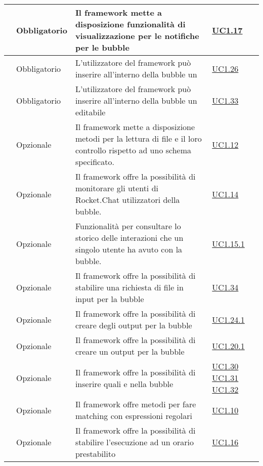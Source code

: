\begin{longtable}{|P{1.5cm}|P{2.5cm}|P{6.5cm}|P{2.5cm}|}
	\hline \RequisitoObF\label{L16} & Obbligatorio & Il framework mette a disposizione funzionalità di visualizzazione per le notifiche per le bubble & \hyperref[UC1.17]{UC1.17} \\
	\hline \RequisitoObF\label{L33} & Obbligatorio & L'utilizzatore del framework può inserire all'interno della bubble un  & \hyperref[UC1.26]{UC1.26} \\
	\hline \RequisitoObF\label{L34} & Obbligatorio & L'utilizzatore del framework può inserire all'interno della bubble un  editabile & \hyperref[UC1.33]{UC1.33} \\
	\hline \RequisitoOpF\label{L35} & Opzionale & Il framework mette a disposizione metodi per la lettura di file  e il loro controllo rispetto ad uno schema specificato. & \hyperref[UC1.12]{UC1.12} \\
	\hline \RequisitoOpF\label{L36} & Opzionale & Il framework offre la possibilità di monitorare gli utenti di Rocket.Chat utilizzatori della bubble. & \hyperref[UC1.14]{UC1.14} \\
	\hline \RequisitoOpF\label{L37} & Opzionale & Funzionalità per consultare lo storico delle interazioni che un singolo utente ha avuto con la bubble. & \hyperref[UC1.15.1]{UC1.15.1} \\
	\hline \RequisitoOpF\label{L38} & Opzionale & Il framework offre la possibilità di stabilire una richiesta di file in input per la bubble & \hyperref[UC1.34]{UC1.34} \\
	\hline \RequisitoOpF\label{L39} & Opzionale & Il framework offre la possibilità di creare degli output per la bubble & \hyperref[UC1.24.1]{UC1.24.1} \\
	\hline \RequisitoOpF\label{L40} & Opzionale & Il framework offre la possibilità di creare un output  per la bubble & \hyperref[UC1.20.1]{UC1.20.1} \\	
	\hline \RequisitoOpF\label{L41} & Opzionale & Il framework offre la possibilità di inserire  quali  e  nella bubble & \hyperref[UC1.30]{UC1.30} \linebreak \hyperref[UC1.31]{UC1.31} \linebreak \hyperref[UC1.32]{UC1.32} \\
	\hline \RequisitoOpF\label{L42} & Opzionale & Il framework offre metodi per fare matching con espressioni regolari
	 & \hyperref[UC1.10]{UC1.10} \\
	\hline \RequisitoOpF\label{L43} & Opzionale & Il framework offre la possibilità di stabilire l'esecuzione ad un orario prestabilito & \hyperref[UC1.16]{UC1.16} \\

\end{longtable}
